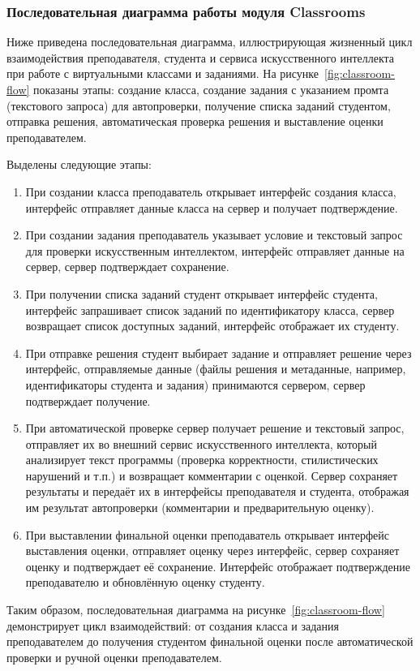 \subsubsection{Последовательная диаграмма работы модуля Classrooms}
Ниже приведена последовательная диаграмма, иллюстрирующая жизненный цикл взаимодействия преподавателя, студента и сервиса искусственного интеллекта при работе с виртуальными классами и заданиями. На рисунке~\ref{fig:classroom-flow} показаны этапы: создание класса, создание задания с указанием промта (текстового запроса) для автопроверки, получение списка заданий студентом, отправка решения, автоматическая проверка решения и выставление оценки преподавателем.

Выделены следующие этапы:

\begin{enumerate}
    \item При создании класса преподаватель открывает интерфейс создания класса, интерфейс отправляет данные класса на сервер и получает подтверждение.
    \item При создании задания преподаватель указывает условие и текстовый запрос для проверки искусственным интеллектом, интерфейс отправляет данные на сервер, сервер подтверждает сохранение.
    \item При получении списка заданий студент открывает интерфейс студента, интерфейс запрашивает список заданий по идентификатору класса, сервер возвращает список доступных заданий, интерфейс отображает их студенту.
    \item При отправке решения студент выбирает задание и отправляет решение через интерфейс, отправляемые данные (файлы решения и метаданные, например, идентификаторы студента и задания) принимаются сервером, сервер подтверждает получение.
    \item При автоматической проверке сервер получает решение и текстовый запрос, отправляет их во внешний сервис искусственного интеллекта, который анализирует текст программы (проверка корректности, стилистических нарушений и т.п.) и возвращает комментарии с оценкой. Сервер сохраняет результаты и передаёт их в интерфейсы преподавателя и студента, отображая им результат автопроверки (комментарии и предварительную оценку).
    \item При выставлении финальной оценки преподаватель открывает интерфейс выставления оценки, отправляет оценку через интерфейс, сервер сохраняет оценку и подтверждает её сохранение. Интерфейс отображает подтверждение преподавателю и обновлённую оценку студенту.
\end{enumerate}

Таким образом, последовательная диаграмма на рисунке~\ref{fig:classroom-flow} демонстрирует цикл взаимодействий: от создания класса и задания преподавателем до получения студентом финальной оценки после автоматической проверки и ручной оценки преподавателем.
